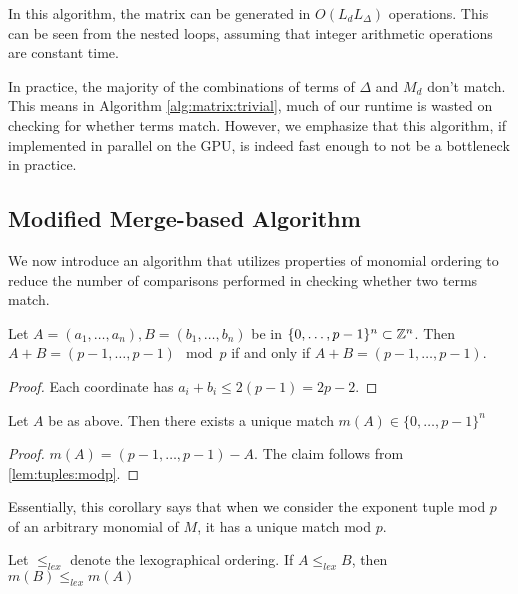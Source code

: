 In this algorithm, the matrix can be generated in 
$O(L_{d}L_{\Delta})$ operations. 
This can be
seen from the nested loops, assuming that integer 
arithmetic operations are constant time.

In practice, the majority of the combinations of 
terms of $\Delta$ and $M_{d}$ don't match. This means in
Algorithm \ref{alg:matrix:trivial}, much of our 
runtime is wasted on checking for whether terms match.
However, we emphasize that this algorithm, if 
implemented in parallel on the GPU, is indeed
fast enough to not be a bottleneck in practice.

\subsection{Modified Merge-based Algorithm}

We now introduce an algorithm that utilizes 
properties of monomial ordering to reduce the 
number of comparisons 
performed in checking whether two terms match.

\begin{lem}
	\label{lem:tuples:modp}
	Let \(A = (a_{1}, \ldots, a_{n}),
	B = (b_{1}, \ldots, b_{n})\)
	be in \(\{0, \ldots, p-1\}^{n} \subset \mathbb{Z}^{n}\).
	Then \(A + B = 
	(p-1, \ldots, p-1) \mod p\)
	if and only if 
	\(A + B = 
	(p-1, \ldots, p-1)\).
\end{lem}

\begin{proof}
	Each coordinate has \(a_{i} + b_{i} \leq 2(p-1) = 2p-2\).
\end{proof}

\begin{cor}
    \label{cor:unique:match}
	Let $A$ be as above.
	Then there exists a unique
	match \(m(A) \in \{0, \ldots, p-1\}^{n}\) 
\end{cor}

\begin{proof}
	\(m(A) = 
	(p-1, \ldots, p-1) - A\).
	The claim follows from 
	\ref{lem:tuples:modp}.
\end{proof}

Essentially, this corollary says that
when we consider the exponent tuple mod $p$ of 
an arbitrary monomial of \(M\),
it has a unique
match mod \(p\).

\begin{cor}
	\label{cor:match:order}
	Let \(\leq_{lex}\) denote the 
	lexographical ordering.
	If \(A \leq_{lex} B\),
	then 
	\(m(B) \leq_{lex} m(A)\)
\end{cor}

